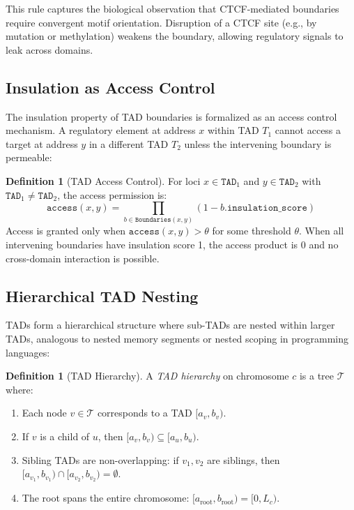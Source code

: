 \documentclass[12pt,a4paper]{article}
\theoremstyle{plain}
\theoremstyle{definition}
\newtheorem{definition}[theorem]{Definition}
\begin{document}
This rule captures the biological observation that CTCF-mediated boundaries require convergent motif orientation. Disruption of a CTCF site (e.g., by mutation or methylation) weakens the boundary, allowing regulatory signals to leak across domains.

\subsection{Insulation as Access Control}

The insulation property of TAD boundaries is formalized as an access control mechanism. A regulatory element at address $x$ within TAD $T_1$ cannot access a target at address $y$ in a different TAD $T_2$ unless the intervening boundary is permeable:

\begin{definition}[TAD Access Control]\label{def:tad-access}
For loci $x \in \texttt{TAD}_1$ and $y \in \texttt{TAD}_2$ with $\texttt{TAD}_1 \neq \texttt{TAD}_2$, the access permission is:
\[
  \texttt{access}(x, y) = \prod_{b \in \texttt{Boundaries}(x,y)} (1 - b.\texttt{insulation\_score})
\]
Access is granted only when $\texttt{access}(x, y) > \theta$ for some threshold $\theta$. When all intervening boundaries have insulation score 1, the access product is 0 and no cross-domain interaction is possible.
\end{definition}

\subsection{Hierarchical TAD Nesting}

TADs form a hierarchical structure where sub-TADs are nested within larger TADs, analogous to nested memory segments or nested scoping in programming languages:

\begin{definition}[TAD Hierarchy]\label{def:tad-hierarchy}
A \emph{TAD hierarchy} on chromosome $c$ is a tree $\mathcal{T}$ where:
\begin{enumerate}[label=(\alph*)]
  \item Each node $v \in \mathcal{T}$ corresponds to a TAD $[a_v, b_v)$.
  \item If $v$ is a child of $u$, then $[a_v, b_v) \subseteq [a_u, b_u)$.
  \item Sibling TADs are non-overlapping: if $v_1, v_2$ are siblings, then $[a_{v_1}, b_{v_1}) \cap [a_{v_2}, b_{v_2}) = \emptyset$.
  \item The root spans the entire chromosome: $[a_{\text{root}}, b_{\text{root}}) = [0, L_c)$.
\end{enumerate}
\end{definition}
\end{document}
